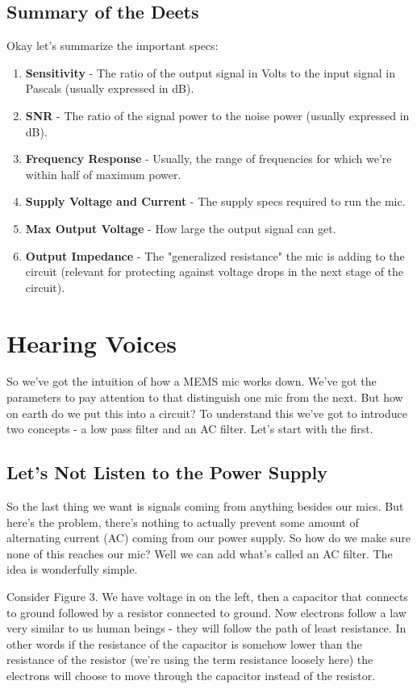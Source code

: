 \documentclass[12pt,a6paper]{book}
\begin{document}
\subsection{Summary of the Deets}
Okay let's summarize the important specs:
\begin{enumerate}
\item \textbf{Sensitivity} - The ratio of the output signal in Volts to the input signal in Pascals (usually expressed in dB).
\item \textbf{SNR} - The ratio of the signal power to the noise power (usually expressed in dB). 
\item \textbf{Frequency Response} - Usually, the range of frequencies for which we're within half of maximum power. 
\item \textbf{Supply Voltage and Current} - The supply specs required to run the mic.
\item \textbf{Max Output Voltage} - How large the output signal can get.
\item \textbf{Output Impedance} - The "generalized resistance" the mic is adding to the circuit (relevant for protecting against voltage drops in the next stage of the circuit).
\end{enumerate}
\section{Hearing Voices}
So we've got the intuition of how a MEMS mic works down. We've got the parameters to pay attention to that distinguish one mic from the next. But how on earth do we put this into a circuit? To understand this we've got to introduce two concepts - a low pass filter and an AC filter. Let's start with the first. 

\subsection{Let's Not Listen to the Power Supply}
So the last thing we want is signals coming from anything besides our mics. But here's the problem, there's nothing to actually prevent some amount of alternating current (AC) coming from our power supply. So how do we make sure none of this reaches our mic? Well we can add what's called an AC filter. The idea is wonderfully simple. 

Consider Figure 3. We have voltage in on the left, then a capacitor that connects to ground followed by a resistor connected to ground. Now electrons follow a law very similar to us human beings - they will follow the path of least resistance. In other words if the resistance of the capacitor is somehow lower than the resistance of the resistor (we're using the term resistance loosely here) the electrons will choose to move through the capacitor instead of the resistor. 
\end{document}
